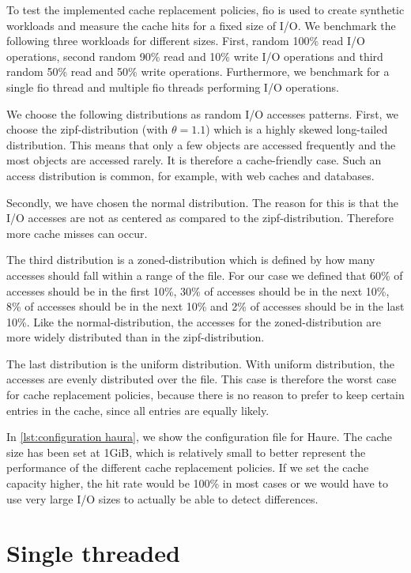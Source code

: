 \documentclass[
	12pt,
	a4paper,
	abstract,
	bibliography=totoc,
	chapterprefix,
	headings=openright,
	numbers=endperiod,
	parskip=half,
	twoside,
]{scrreprt}
\begin{document}
To test the implemented cache replacement policies, 
fio is used to create synthetic workloads and measure the cache hits
for a fixed size of I/O.
We benchmark the following three workloads for different sizes.
First, random 100\% read I/O operations, second random 90\% read and 10\% write I/O operations
and third random 50\% read and 50\% write operations. 
Furthermore, we benchmark for a single fio thread and multiple fio threads performing I/O operations.

We choose the following distributions as random I/O accesses patterns.
First, we choose the zipf-distribution (with $\theta=1.1$) which is a highly skewed long-tailed distribution.
This means that only a few objects are accessed frequently and the most objects are accessed rarely.
It is therefore a cache-friendly case.
Such an access distribution is common, for example, with web caches and databases.

Secondly, we have chosen the normal distribution.
The reason for this is that the I/O accesses are not as centered as compared to the zipf-distribution.
Therefore more cache misses can occur.

The third distribution is a zoned-distribution which is defined by 
how many accesses should fall within a range of the file.
For our case we defined that 60\% of accesses should be in the first 10\%,
30\% of accesses should be in the next 10\%, 8\% of accesses should be in the next 10\% and
2\% of accesses should be in the last 10\%.
Like the normal-distribution, the accesses for the 
zoned-distribution are more widely distributed than in the zipf-distribution.

The last distribution is the uniform distribution.
With uniform distribution, the accesses are evenly distributed over the file.
This case is therefore the worst case for cache replacement policies, 
because there is no reason to prefer to keep certain entries in the cache, 
since all entries are equally likely.

In \ref{lst:configuration haura}, we show the configuration file for Haure.
The cache size has been set at 1GiB, which is relatively small to better 
represent the performance of the different cache replacement policies.
If we set the cache capacity higher, the hit rate would be 100\% 
in most cases or we would have to use very large I/O sizes to actually be able to detect differences.


\newpage
\section{Single threaded}
\end{document}
